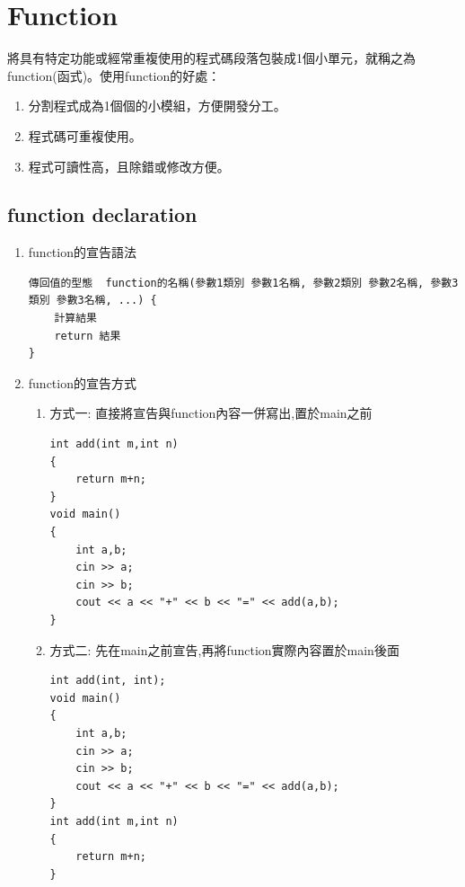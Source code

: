 \documentclass[a4paper,12pt]{article}
\begin{document}
\section{Function}
\label{cpp_functions}
將具有特定功能或經常重複使用的程式碼段落包裝成1個小單元，就稱之為function(函式)。使用function的好處：\\
\begin{enumerate}
\item 分割程式成為1個個的小模組，方便開發分工。\\
\item 程式碼可重複使用。\\
\item 程式可讀性高，且除錯或修改方便。\\
\end{enumerate}
\subsection{function declaration}
\label{sec:org720babf}
\begin{enumerate}
\item function的宣告語法
\label{sec:org3647866}
\lstset{breaklines=true,language=cpp,label= ,caption= ,captionpos=b,firstnumber=1,numbers=left}
\begin{lstlisting}
傳回值的型態  function的名稱(參數1類別 參數1名稱, 參數2類別 參數2名稱, 參數3類別 參數3名稱, ...) {
    計算結果
    return 結果
}
\end{lstlisting}

\item function的宣告方式
\label{sec:orgec818d3}
\begin{enumerate}
\item 方式一:  直接將宣告與function內容一併寫出,置於main之前
\label{sec:org4e7dcd0}
\lstset{breaklines=true,language=cpp,label= ,caption= ,captionpos=b,firstnumber=1,numbers=left}
\begin{lstlisting}
int add(int m,int n)
{
    return m+n;
}
void main()
{
    int a,b;
    cin >> a;
    cin >> b;
    cout << a << "+" << b << "=" << add(a,b);
}

\end{lstlisting}

\item 方式二: 先在main之前宣告,再將function實際內容置於main後面
\label{sec:org26a6ced}
\lstset{breaklines=true,language=cpp,label= ,caption= ,captionpos=b,firstnumber=1,numbers=left}
\begin{lstlisting}
int add(int, int);
void main()
{
    int a,b;
    cin >> a;
    cin >> b;
    cout << a << "+" << b << "=" << add(a,b);
}
int add(int m,int n)
{
    return m+n;
}
\end{lstlisting}
\end{enumerate}
\end{enumerate}
\end{document}
